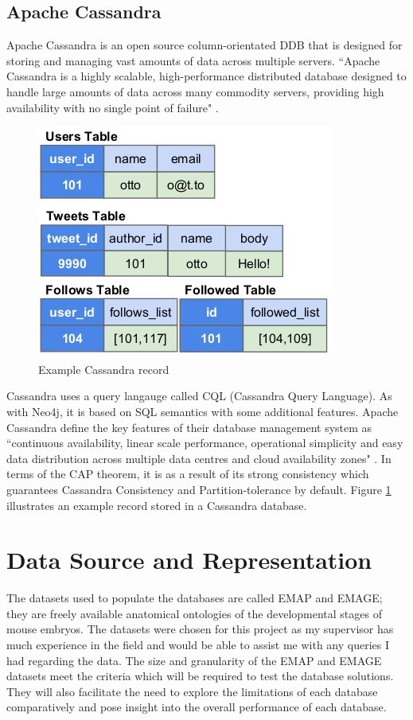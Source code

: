 \subsection{Apache Cassandra}\label{cassandra}
Apache Cassandra is an open source column-orientated DDB that is designed for storing and managing vast amounts of data across multiple servers. ``Apache Cassandra is a highly scalable, high-performance distributed database designed to handle large amounts of data across many commodity servers, providing high availability with no single point of failure" \cite{cassandra}. \begin{figure}[H]\begin{center}\includegraphics[width=0.7\linewidth]{images/cassandramodel}\caption{Example Cassandra record}\label{fig:cass}\end{center}\end{figure}Cassandra uses a query langauge called CQL (Cassandra Query Language). As with Neo4j, it is based on SQL semantics with some additional features. Apache Cassandra define the key features of their database management system as ``continuous availability, linear scale performance, operational simplicity and easy data distribution across multiple data centres and cloud availability zones" \cite{cassandra}. In terms of the CAP theorem, it is as a result of its strong consistency which guarantees Cassandra Consistency and Partition-tolerance by default. Figure \ref{fig:cass} illustrates an example record stored in a Cassandra database.

\section{Data Source and Representation}\label{datasource}
The datasets used to populate the databases are called EMAP and EMAGE; they are freely available anatomical ontologies of the developmental stages of mouse embryos. The datasets were chosen for this project as my supervisor has much experience in the field and would be able to assist me with any queries I had regarding the data. The size and granularity of the EMAP and EMAGE datasets meet the criteria which will be required to test the database solutions. They will also facilitate the need to explore the limitations of each database comparatively and pose insight into the overall performance of each database.

